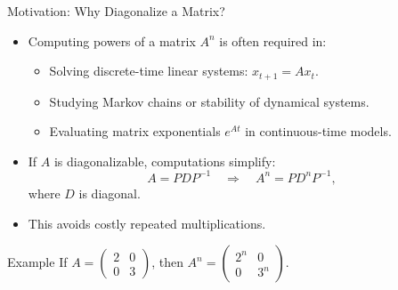 \documentclass[aspectratio=169]{beamer}
\begin{document}
\begin{frame}{Motivation: Why Diagonalize a Matrix?}

\begin{itemize}
  \item Computing powers of a matrix $A^n$ is often required in:
  \begin{itemize}
    \item Solving discrete-time linear systems: $x_{t+1}=A x_t$.
    \item Studying Markov chains or stability of dynamical systems.
    \item Evaluating matrix exponentials $e^{At}$ in continuous-time models.
  \end{itemize}
  \pause
  \item If $A$ is diagonalizable, computations simplify:
  \[
  A = P D P^{-1} \quad \Rightarrow \quad A^n = P D^n P^{-1},
  \]
  where $D$ is diagonal.
  \item This avoids costly repeated multiplications.
\end{itemize}

\pause
\begin{exampleblock}{Example}
If $A = \begin{pmatrix}2 & 0\\0 & 3\end{pmatrix}$,  
then $A^n = \begin{pmatrix}2^n & 0\\0 & 3^n\end{pmatrix}$.
\end{exampleblock}

\end{frame}
\end{document}
